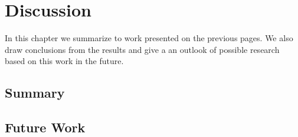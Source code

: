 \chapter{Discussion} \label{chapter:conclusions}

In this chapter we summarize to work presented on the previous pages. We also draw conclusions from the results and give a an outlook of possible research based on this work in the future.

\section{Summary}

\section{Future Work}




